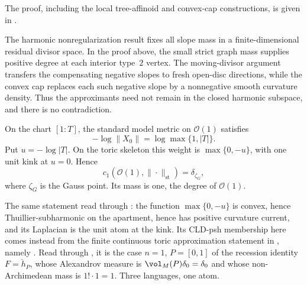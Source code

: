 

The proof, including the local tree-affinoid and convex-cap constructions,
is given in .

\begin{remark}
\label{rem:ch19-positive-curvature-regularization}
The harmonic nonregularization result
 fixes all slope mass
in a finite-dimensional residual divisor space.  In the proof above, the
small strict graph mass supplies positive degree at each interior type~$2$
vertex.  The moving-divisor argument transfers the compensating negative
slopes to fresh open-disc directions, while the convex cap replaces each
such negative slope by a nonnegative smooth curvature density.  Thus the
approximants need not remain in the closed harmonic subspace, and there is no
contradiction.
\end{remark}

\begin{example}
\label{ex:ch19-p1-standard}
On the chart $[1:T]$, the standard model metric on $\mathcal O(1)$
satisfies
\[
              -\log\|X_0\|=\log\max\{1,|T|\}.
\]
Put $u=-\log|T|$.  On the toric skeleton this weight is
$\max\{0,-u\}$, with one unit kink at $u=0$.  Hence
\[
                   c_1(\mathcal O(1),\|\cdot\|_{\mathrm{st}})
                          =\delta_{\zeta_G},
\]
where $\zeta_G$ is the Gauss point.  Its mass is one, the degree of
$\mathcal O(1)$.

The same statement read through : the
function $\max\{0,-u\}$ is convex, hence Thuillier-subharmonic on the
apartment, hence has positive curvature current, and its Laplacian is the
unit atom at the kink.  Its CLD-psh membership here comes instead from the
finite continuous toric approximation statement in
, namely
\cite[Theorem~5.3.11]{BGJKK25}.
Read through , it is the case $n=1$, $P=[0,1]$ of
the recession identity $F=\check h_P$, whose Alexandrov measure is
$\vol_M(P)\delta_0=\delta_0$ and whose non-Archimedean mass is
$1!\cdot1=1$.  Three languages, one atom.
\end{example}

